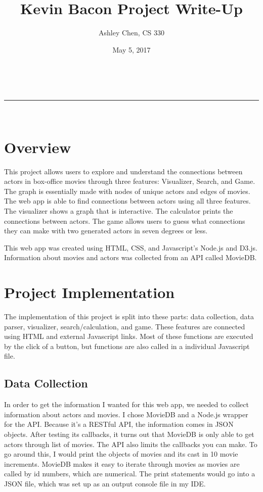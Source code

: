 \documentclass[a4paper,11pt]{article}
\makeatletter
\newcommand{\linia}{\rule{\linewidth}{0.5pt}}
\renewcommand{\maketitle}{
\begin{center}
\vspace{2ex}
{\huge \textsc{\@title}}
\vspace{1ex}
\\
\linia\\
\@author \hfill \@date
\vspace{4ex}
\end{center}
}
\makeatother
\begin{document}
\title{Kevin Bacon Project Write-Up}

\author{Ashley Chen, CS 330}

\date{May 5, 2017}

\maketitle

\section*{Overview}
This project allows users to explore and understand the connections between actors in box-office movies through three features: Visualizer, Search, and Game. The graph is essentially made with nodes of unique actors and edges of movies. The web app is able to find connections between actors using all three features. The visualizer shows a graph that is interactive. The calculator prints the connections between actors. The game allows users to guess what connections they can make with two generated actors in seven degrees or less.

This web app was created using HTML, CSS, and Javascript's Node.js and D3.js. Information about movies and actors was collected from an API called MovieDB.

\section*{Project Implementation}
The implementation of this project is split into these parts: data collection, data parser, visualizer, search/calculation, and game. These features are connected using HTML and external Javascript links. Most of these functions are executed by the click of a button, but functions are also called in a individual Javascript file.

\subsection*{Data Collection}
In order to get the information I wanted for this web app, we needed to collect information about actors and movies. I chose MovieDB and a Node.js wrapper for the API. Because it's a RESTful API, the information comes in JSON objects. After testing its callbacks, it turns out that MovieDB is only able to get actors through list of movies. The API also limits the callbacks you can make. To go around this, I would print the objects of movies and its cast in 10 movie increments. MovieDB makes it easy to iterate through movies as movies are called by id numbers, which are numerical. The print statements would go into a JSON file, which was set up as an output console file in my IDE.
\end{document}
